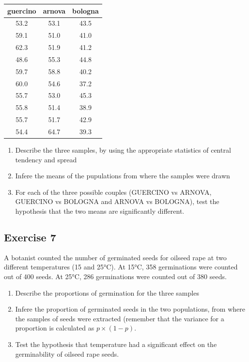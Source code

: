 \documentclass[a4paper,12pt,oneside]{book}
\providecommand{\tightlist}{%
  \setlength{\itemsep}{0pt}\setlength{\parskip}{0pt}}
\begin{document}
\begin{tabular}{c|c|c}
\hline
guercino & arnova & bologna\\
\hline
53.2 & 53.1 & 43.5\\
\hline
59.1 & 51.0 & 41.0\\
\hline
62.3 & 51.9 & 41.2\\
\hline
48.6 & 55.3 & 44.8\\
\hline
59.7 & 58.8 & 40.2\\
\hline
60.0 & 54.6 & 37.2\\
\hline
55.7 & 53.0 & 45.3\\
\hline
55.8 & 51.4 & 38.9\\
\hline
55.7 & 51.7 & 42.9\\
\hline
54.4 & 64.7 & 39.3\\
\hline
\end{tabular}

\begin{enumerate}
\def\labelenumi{\arabic{enumi}.}
\tightlist
\item
  Describe the three samples, by using the appropriate statistics of central tendency and spread
\item
  Infere the means of the pupulations from where the samples were drawn
\item
  For each of the three possible couples (GUERCINO vs ARNOVA, GUERCINO vs BOLOGNA and ARNOVA vs BOLOGNA), test the hypothesis that the two means are significantly different.
\end{enumerate}

\hypertarget{exercise-7}{%
\subsection{Exercise 7}\label{exercise-7}}

A botanist counted the number of germinated seeds for oilseed rape at two different temperatures (15 and 25°C). At 15°C, 358 germinations were counted out of 400 seeds. At 25°C, 286 germinations were counted out of 380 seeds.

\begin{enumerate}
\def\labelenumi{\arabic{enumi}.}
\tightlist
\item
  Describe the proportions of germination for the three samples
\item
  Infere the proportion of germinated seeds in the two populations, from where the samples of seeds were extracted (remember that the variance for a proportion is calculated as \(p \times (1- p)\).
\item
  Test the hypothesis that temperature had a significant effect on the germinability of oilseed rape seeds.
\end{enumerate}
\end{document}
